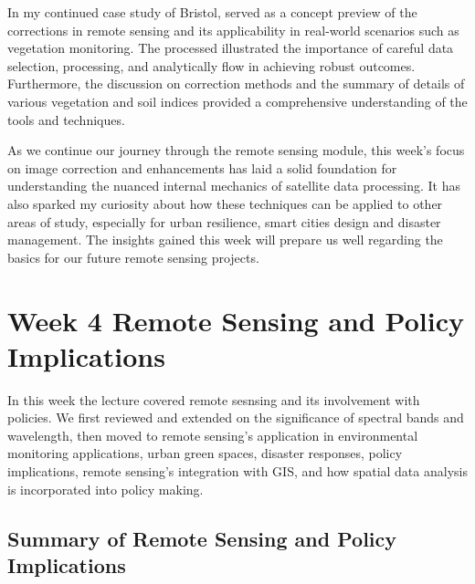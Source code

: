 \documentclass[
  letterpaper,
  DIV=11,
  numbers=noendperiod]{scrreprt}
\begin{document}
In my continued case study of Bristol, served as a concept preview of
the corrections in remote sensing and its applicability in real-world
scenarios such as vegetation monitoring. The processed illustrated the
importance of careful data selection, processing, and analytically flow
in achieving robust outcomes. Furthermore, the discussion on correction
methods and the summary of details of various vegetation and soil
indices provided a comprehensive understanding of the tools and
techniques.

As we continue our journey through the remote sensing module, this
week's focus on image correction and enhancements has laid a solid
foundation for understanding the nuanced internal mechanics of satellite
data processing. It has also sparked my curiosity about how these
techniques can be applied to other areas of study, especially for urban
resilience, smart cities design and disaster management. The insights
gained this week will prepare us well regarding the basics for our
future remote sensing projects.

\hypertarget{week-4-remote-sensing-and-policy-implications}{%
\chapter*{Week 4 Remote Sensing and Policy
Implications}\label{week-4-remote-sensing-and-policy-implications}}


In this week the lecture covered remote sesnsing and its involvement
with policies. We first reviewed and extended on the significance of
spectral bands and wavelength, then moved to remote sensing's
application in environmental monitoring applications, urban green
spaces, disaster responses, policy implications, remote sensing's
integration with GIS, and how spatial data analysis is incorporated into
policy making.

\hypertarget{summary-of-remote-sensing-and-policy-implications}{%
\section*{Summary of Remote Sensing and Policy
Implications}\label{summary-of-remote-sensing-and-policy-implications}}
\end{document}
